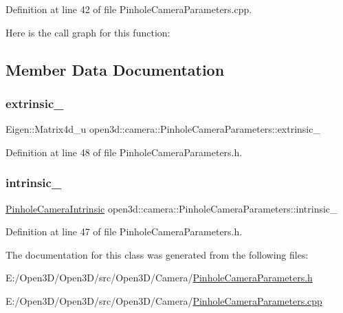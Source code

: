 Definition at line 42 of file Pinhole\+Camera\+Parameters.\+cpp.

Here is the call graph for this function\+:


\subsection{Member Data Documentation}
\mbox{\label{classopen3d_1_1camera_1_1_pinhole_camera_parameters_aa2ff2967cce46974ed24db28a37bb198}} 
\subsubsection{\texorpdfstring{extrinsic\_}{extrinsic\_}}
{\footnotesize\ttfamily Eigen\+::\+Matrix4d\+\_\+u open3d\+::camera\+::\+Pinhole\+Camera\+Parameters\+::extrinsic\+\_\+}



Definition at line 48 of file Pinhole\+Camera\+Parameters.\+h.

\mbox{\label{classopen3d_1_1camera_1_1_pinhole_camera_parameters_a55ac6c7f9df8057bf9bfe268b0f69ee3}} 
\subsubsection{\texorpdfstring{intrinsic\_}{intrinsic\_}}
{\footnotesize\ttfamily \mbox{\hyperlink{classopen3d_1_1camera_1_1_pinhole_camera_intrinsic}{Pinhole\+Camera\+Intrinsic}} open3d\+::camera\+::\+Pinhole\+Camera\+Parameters\+::intrinsic\+\_\+}



Definition at line 47 of file Pinhole\+Camera\+Parameters.\+h.



The documentation for this class was generated from the following files\+:\begin{DoxyCompactItemize}
\item 
E\+:/\+Open3\+D/\+Open3\+D/src/\+Open3\+D/\+Camera/\mbox{\hyperlink{_pinhole_camera_parameters_8h}{Pinhole\+Camera\+Parameters.\+h}}\item 
E\+:/\+Open3\+D/\+Open3\+D/src/\+Open3\+D/\+Camera/\mbox{\hyperlink{_pinhole_camera_parameters_8cpp}{Pinhole\+Camera\+Parameters.\+cpp}}\end{DoxyCompactItemize}

